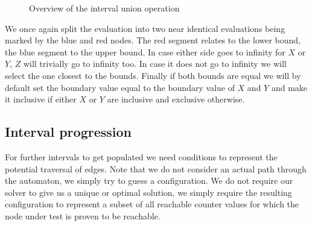 \documentclass[12pt]{thesis}
\begin{document}
\begin{figure}
	\caption{Overview of the interval union operation}
	\label{fig:union}
\end{figure}


We once again split the evaluation into two near identical evaluations being marked by the blue and red nodes. The red segment relates to the lower bound, the blue segment to the upper bound. In case either side goes to infinity for $X$ or $Y$, $Z$ will trivially go to infinity too. In case it does not go to infinity we will select the one closest to the bounds. Finally if both bounds are equal we will by default set the boundary value equal to the boundary value of $X$ and $Y$ and make it inclusive if either $X$ or $Y$ are inclusive and exclusive otherwise.

\subsection{Interval progression}
For further intervals to get populated we need conditions to represent the potential traversal of edges. Note that we do not consider an actual path through the automaton, we simply try to guess a configuration. We do not require our solver to give us a unique or optimal solution, we simply require the resulting configuration to represent a subset of all reachable counter values for which the node under test is proven to be reachable.
\end{document}
